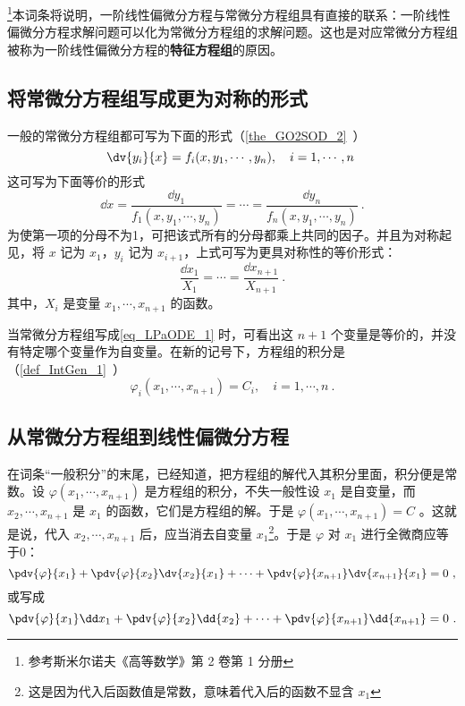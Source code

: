\footnote{参考斯米尔诺夫《高等数学》第 2 卷第 1 分册}本词条将说明，一阶线性偏微分方程与常微分方程组具有直接的联系：一阶线性偏微分方程求解问题可以化为常微分方程组的求解问题。这也是对应常微分方程组被称为一阶线性偏微分方程的\textbf{特征方程组}的原因。
\subsection{将常微分方程组写成更为对称的形式}
一般的常微分方程组都可写为下面的形式（\autoref{the_GO2SOD_2}~）
\begin{equation}\label{eq_LPaODE_4}
\dv{y_i}{x}=f_i(x,y_1,\cdots,y_n),\quad i=1,\cdots,n~
\end{equation}
这可写为下面等价的形式
\begin{equation}
\dd x=\frac{\dd y_1}{f_1(x,y_1,\cdots,y_n)}=\cdots=\frac{\dd y_n}{f_n(x,y_1,\cdots,y_n)}~.
\end{equation}
为使第一项的分母不为1，可把该式所有的分母都乘上共同的因子。并且为对称起见，将 $x$ 记为 $x_1$，$y_i$ 记为 $x_{i+1}$，上式可写为更具对称性的等价形式：
\begin{equation}\label{eq_LPaODE_1}
\frac{\dd x_1}{X_1}=\cdots=\frac{\dd x_{n+1}}{X_{n+1}}~.
\end{equation}
其中，$X_i$ 是变量 $x_1,\cdots,x_{n+1}$ 的函数。

当常微分方程组写成\autoref{eq_LPaODE_1} 时，可看出这 $n+1$ 个变量是等价的，并没有特定哪个变量作为自变量。在新的记号下，方程组的积分是（\autoref{def_IntGen_1}~）
\begin{equation}
\varphi_i(x_1,\cdots,x_{n+1})=C_i,\quad i=1,\cdots,n~.
\end{equation}
\subsection{从常微分方程组到线性偏微分方程}
在词条“一般积分”的末尾，已经知道，把方程组的解代入其积分里面，积分便是常数。设 $\varphi(x_1,\cdots,x_{n+1})$ 是方程组的积分，不失一般性设 $x_1$ 是自变量，而 $x_2,\cdots,x_{n+1}$ 是 $x_1$ 的函数，它们是方程组的解。于是 $\varphi(x_1,\cdots,x_{n+1})=C$ 。这就是说，代入 $x_2,\cdots,x_{n+1}$ 后，应当消去自变量 $x_1$\footnote{这是因为代入后函数值是常数，意味着代入后的函数不显含 $x_1$}。于是 $\varphi$ 对 $x_1$ 进行全微商应等于0：
\begin{equation}
\pdv{\varphi}{x_1}+\pdv{\varphi}{x_2}\dv{x_2}{x_1}+\cdots+\pdv{\varphi}{x_{n+1}}\dv{x_{n+1}}{x_1}=0~,
\end{equation}
或写成
\begin{equation}\label{eq_LPaODE_2}
\pdv{\varphi}{x_1}\dd x_1+\pdv{\varphi}{x_2}\dd{x_2}+\cdots+\pdv{\varphi}{x_{n+1}}\dd{x_{n+1}}=0~.
\end{equation}

